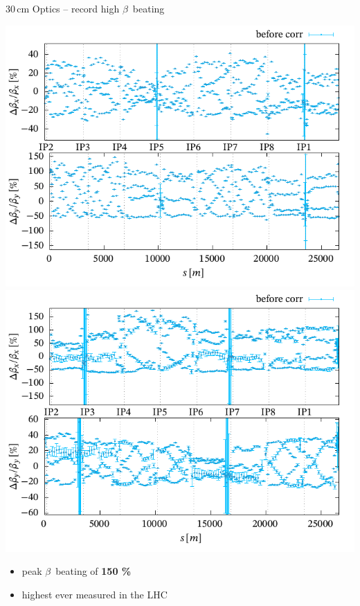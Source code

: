 \documentclass[4pt,usenames,dvipsnames,aspectratio=169]{beamer}
\begin{document}
\begin{frame}{30\,cm Optics -- record high $\beta$~beating}

    \includegraphics[width=0.49\linewidth]{images/squeeze/b1_recordhigh.pdf}
    \hfill
    \includegraphics[width=0.49\linewidth]{images/squeeze/b2_recordhigh.pdf}
    
    \begin{itemize}
        \item peak $\beta$~beating of \textbf{150 \%}
        \item highest ever measured in the LHC
    \end{itemize}
    
\end{frame}
\end{document}
